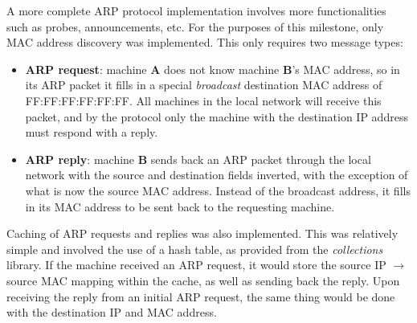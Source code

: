 A more complete ARP protocol implementation involves more functionalities such as probes, announcements, etc. For the purposes of this milestone, only MAC address discovery was implemented. This only requires two message types:
\begin{itemize}
    \item \textbf{ARP request}: machine \textbf{A} does not know machine \textbf{B}'s MAC address, so in its ARP packet it fills in a special \textit{broadcast} destination MAC address of FF:FF:FF:FF:FF:FF. All machines in the local network will receive this packet, and by the protocol only the machine with the destination IP address must respond with a reply.
    \item \textbf{ARP reply}: machine \textbf{B} sends back an ARP packet through the local network with the source and destination fields inverted, with the exception of what is now the source MAC address. Instead of the broadcast address, it fills in its MAC address to be sent back to the requesting machine.
\end{itemize}
Caching of ARP requests and replies was also implemented. This was relatively simple and involved the use of a hash table, as provided from the \textit{collections} library. If the machine received an ARP request, it would store the source IP $\rightarrow$ source MAC mapping within the cache, as well as sending back the reply. Upon receiving the reply from an initial ARP request, the same thing would be done with the destination IP and MAC address.

